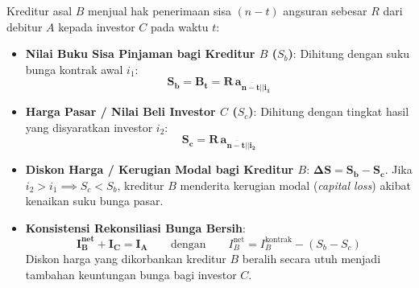 \documentclass[10pt,a4paper]{article}
\newcommand{\angl}[1]{\overline{#1|}}
\begin{document}
\begin{teoremabox}
Kreditur asal $B$ menjual hak penerimaan sisa $(n-t)$ angsuran sebesar $R$ dari debitur $A$ kepada investor $C$ pada waktu $t$:
\begin{itemize}[leftmargin=1.5em, topsep=1.5pt, itemsep=2pt]
    \item \textbf{Nilai Buku Sisa Pinjaman bagi Kreditur $B$ ($S_b$)}: Dihitung dengan suku bunga kontrak awal $i_1$:
    \begin{equation*}
        \mathbf{S_b = B_t = R \, a_{\angl{n-t}|i_1}}
    \end{equation*}
    \item \textbf{Harga Pasar / Nilai Beli Investor $C$ ($S_c$)}: Dihitung dengan tingkat hasil yang disyaratkan investor $i_2$:
    \begin{equation*}
        \mathbf{S_c = R \, a_{\angl{n-t}|i_2}}
    \end{equation*}
    \item \textbf{Diskon Harga / Kerugian Modal bagi Kreditur $B$}: $\mathbf{\Delta S = S_b - S_c}$.
    Jika $i_2 > i_1 \implies S_c < S_b$, kreditur $B$ menderita kerugian modal (\textit{capital loss}) akibat kenaikan suku bunga pasar.
    \item \textbf{Konsistensi Rekonsiliasi Bunga Bersih}:
    \begin{equation*}
        \mathbf{I_B^{\text{net}} + I_C = I_A} \qquad\text{dengan}\qquad I_B^{\text{net}} = I_B^{\text{kontrak}} - (S_b - S_c)
    \end{equation*}
    Diskon harga yang dikorbankan kreditur $B$ beralih secara utuh menjadi tambahan keuntungan bunga bagi investor $C$.
\end{itemize}
\end{teoremabox}
\end{document}
